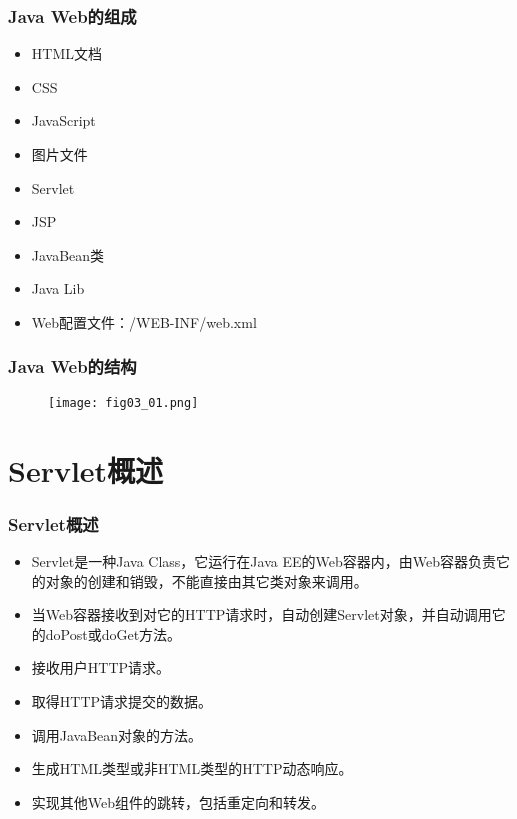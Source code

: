 \begin{frame}
\frametitle{Java Web的组成} 
\begin{itemize}
\item HTML文档
\item CSS
\item JavaScript
\item 图片文件
\item Servlet
\item JSP
\item JavaBean类
\item Java Lib
\item Web配置文件：/WEB-INF/web.xml
\end{itemize}
\end{frame}

\begin{frame}
\frametitle{Java Web的结构} 
\begin{figure}
\centering
\texttt{[image: fig03\_01.png]}
\end{figure}
\end{frame}

\section{Servlet概述}

\begin{frame}
\frametitle{Servlet概述}
\begin{itemize}
\item Servlet是一种Java Class，它运行在Java EE的Web容器内，由Web容器负责它的对象的创建和销毁，不能直接由其它类对象来调用。
\item 当Web容器接收到对它的HTTP请求时，自动创建Servlet对象，并自动调用它的doPost或doGet方法。
\end{itemize}

\begin{itemize}
\item 接收用户HTTP请求。
\item 取得HTTP请求提交的数据。
\item 调用JavaBean对象的方法。
\item 生成HTML类型或非HTML类型的HTTP动态响应。
\item 实现其他Web组件的跳转，包括重定向和转发。
\end{itemize}
\end{frame}


